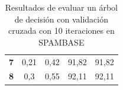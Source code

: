 \begin{table}[H]
\begin{tabular}{@{}|c|cc|cc|@{}}
\textbf{7}                                                                               & 0,21                                       & 0,42                                                                      & 91,82                                      & 91,82                                                                    \\
\textbf{8}                                                                               & 0,3                                        & 0,55                                                                      & 92,11                                      & 92,11                                                                    \\ \bottomrule
\end{tabular}
\caption{Resultados de evaluar un árbol de decisión con validación cruzada con 10 iteraciones en SPAMBASE}
\label{tab:spambase}
\end{table}


